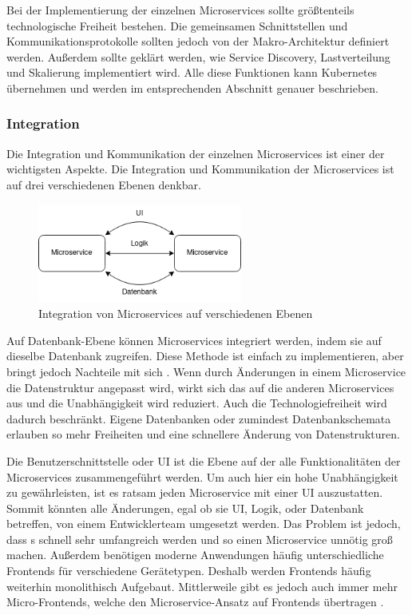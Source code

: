 Bei der Implementierung der einzelnen Microservices sollte größtenteils technologische Freiheit bestehen. Die gemeinsamen Schnittstellen und Kommunikationsprotokolle sollten jedoch von der Makro-Architektur definiert werden. Außerdem sollte geklärt werden, wie Service Discovery, Lastverteilung und Skalierung implementiert wird. Alle diese Funktionen kann Kubernetes übernehmen und werden im entsprechenden Abschnitt genauer beschrieben.

\subsubsection{Integration}

Die Integration und Kommunikation der einzelnen Microservices ist einer der wichtigsten Aspekte. Die Integration und Kommunikation der Microservices ist auf drei verschiedenen Ebenen denkbar.

\begin{figure}[H] 
    \centering
    \includegraphics[width=0.60\textwidth]{figures/IntegrationMicroservices.png}
    \caption{Integration von Microservices auf verschiedenen Ebenen \parencite[vgl.][S. 167]{wolffMicroservices2018}}
\end{figure}

Auf Datenbank-Ebene können Microservices integriert werden, indem sie auf dieselbe Datenbank zugreifen. Diese Methode ist einfach zu implementieren, aber bringt jedoch Nachteile mit sich \parencite[vgl.][S. 69]{newmanMicroservices2015}. Wenn durch Änderungen in einem Microservice die Datenstruktur angepasst wird, wirkt sich das auf die anderen Microservices aus und die Unabhängigkeit wird reduziert. Auch die Technologiefreiheit wird dadurch beschränkt. Eigene Datenbanken oder zumindest Datenbankschemata erlauben so mehr Freiheiten und eine schnellere Änderung von Datenstrukturen.

Die Benutzerschnittstelle oder \ac{UI} ist die Ebene auf der alle Funktionalitäten der Microservices zusammengeführt werden. Um auch hier ein hohe Unabhängigkeit zu gewährleisten, ist es ratsam jeden Microservice mit einer UI auszustatten. Sommit könnten alle Änderungen, egal ob sie UI, Logik, oder Datenbank betreffen, von einem Entwicklerteam umgesetzt werden. Das Problem ist jedoch, dass \acp{} schnell sehr umfangreich werden und so einen Microservice unnötig groß machen. Außerdem benötigen moderne Anwendungen häufig unterschiedliche Frontends für verschiedene Gerätetypen. Deshalb werden Frontends häufig weiterhin monolithisch Aufgebaut. Mittlerweile gibt es jedoch auch immer mehr Micro-Frontends, welche den Microservice-Ansatz auf Frontends übertragen \parencite[vgl.][S. 1]{peltonenMotivations2021}.

